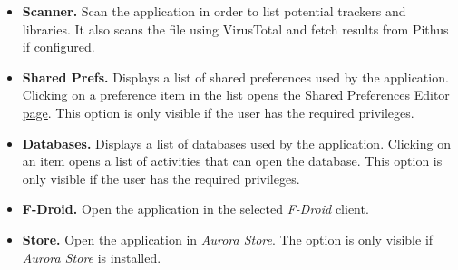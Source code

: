 \begin{itemize}
    \item \textbf{Scanner.} Scan the application in order to list potential trackers and libraries.
    It also scans the file using VirusTotal and fetch results from Pithus if configured.\\

    \item \textbf{Shared Prefs.} Displays a list of shared preferences used by the application.
    Clicking on a preference item in the list opens the \hyperref[sec:shared-preferences-editor-page]{Shared Preferences
    Editor page}. This option is only visible if the user has the required privileges.

    \item \textbf{Databases.} Displays a list of databases used by the application. Clicking on an
    item opens a list of activities that can open the database. This option is only visible if the
    user has the required privileges.

    \item \textbf{F-Droid.} Open the application in the selected \textit{F-Droid} client.

    \item \textbf{Store.} Open the application in \textit{Aurora Store}. The option is only visible if \textit{Aurora
    Store} is installed.
\end{itemize}

